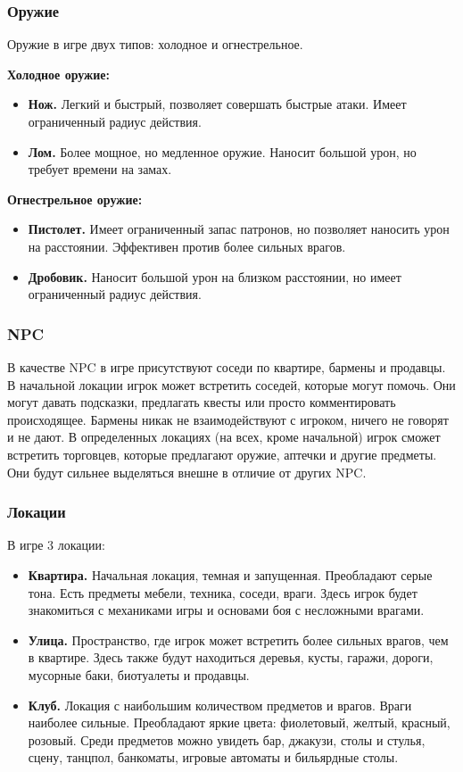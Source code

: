 \documentclass[12pt]{article}
\begin{document}
\subsubsection{Оружие}
Оружие в игре двух типов: холодное и огнестрельное.

    \textbf{Холодное оружие:}
\begin{itemize}[label=--]
    \item \textbf {Нож.} Легкий и быстрый, позволяет совершать быстрые атаки. Имеет ограниченный радиус действия.
    \item \textbf {Лом.} Более мощное, но медленное оружие. Наносит большой урон, но требует времени на замах.
\end{itemize}

    \textbf{Огнестрельное оружие:}
\begin{itemize}[label=--]
    \item \textbf {Пистолет.} Имеет ограниченный запас патронов, но позволяет наносить урон на расстоянии. Эффективен против более сильных врагов.
    \item \textbf {Дробовик.} Наносит большой урон на близком расстоянии, но имеет ограниченный радиус действия.
\end{itemize}

\subsubsection{NPC}
В качестве NPC в игре присутствуют соседи по квартире, бармены и продавцы. В начальной локации игрок может встретить соседей, которые могут помочь. Они могут давать подсказки, предлагать квесты или просто комментировать происходящее. Бармены никак не взаимодействуют с игроком, ничего не говорят и не дают. В определенных локациях (на всех, кроме начальной) игрок сможет встретить торговцев, которые предлагают оружие, аптечки и другие предметы. Они будут сильнее выделяться внешне в отличие от других NPC.

\subsubsection{Локации}
В игре 3 локации:

\begin{itemize}[label=--]
    \item \textbf{Квартира.} Начальная локация, темная и запущенная. Преобладают серые тона. Есть предметы мебели, техника, соседи, враги. Здесь игрок будет знакомиться с механиками игры и основами боя с несложными врагами.
    \item \textbf{Улица.} Пространство, где игрок может встретить более сильных врагов, чем в квартире. Здесь также будут находиться деревья, кусты, гаражи, дороги, мусорные баки, биотуалеты и продавцы.
    \item \textbf{Клуб.} Локация с наибольшим количеством предметов и врагов. Враги наиболее сильные. Преобладают яркие цвета: фиолетовый, желтый, красный, розовый. Среди предметов можно увидеть бар, джакузи, столы и стулья, сцену, танцпол, банкоматы, игровые автоматы и бильярдные столы.
\end{itemize}
\end{document}
